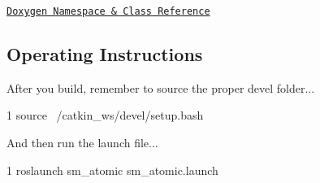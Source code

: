 \href{https://reelrbtx.github.io/SMACC/master/html/namespacesm__atomic.html}{\tt Doxygen Namespace \& Class Reference}

\subsection*{Operating Instructions}

After you build, remember to source the proper devel folder...


\begin{DoxyCode}
1 source ~/catkin\_ws/devel/setup.bash
\end{DoxyCode}


And then run the launch file...


\begin{DoxyCode}
1 roslaunch sm\_atomic sm\_atomic.launch
\end{DoxyCode}
 